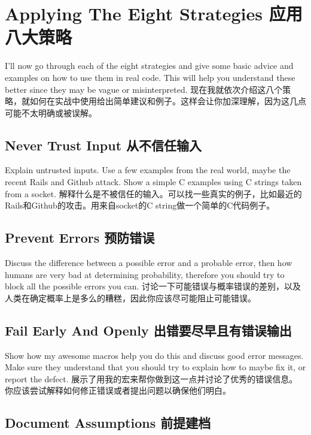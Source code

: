 \section{Applying The Eight Strategies 应用八大策略}

I'll now go through each of the eight strategies and give some basic advice and examples on how to use them in real code.
This will help you understand these better since they may be vague or misinterpreted.
现在我就依次介绍这八个策略，就如何在实战中使用给出简单建议和例子。这样会让你加深理解，因为这几点可能不太明确或被误解。

\subsection{Never Trust Input 从不信任输入}

Explain untrusted inputs. Use a few examples from the real world, maybe the recent Rails and Github attack.
Show a simple C examples using C strings taken from a socket.
解释什么是不被信任的输入。可以找一些真实的例子，比如最近的Rails和Github的攻击。用来自socket的C string做一个简单的C代码例子。

\subsection{Prevent Errors 预防错误}

Discuss the difference between a possible error and a probable error, then how humans are very bad
at determining probability, therefore you should try to block all the possible errors you can.
讨论一下可能错误与概率错误的差别，以及人类在确定概率上是多么的糟糕，因此你应该尽可能阻止可能错误。

\subsection{Fail Early And Openly 出错要尽早且有错误输出}

Show how my awesome macros help you do this and discuss good error messages.  Make sure they understand
that you should try to explain how to maybe fix it, or report the defect.
展示了用我的宏来帮你做到这一点并讨论了优秀的错误信息。 你应该尝试解释如何修正错误或者提出问题以确保他们明白。

\subsection{Document Assumptions 前提建档}

